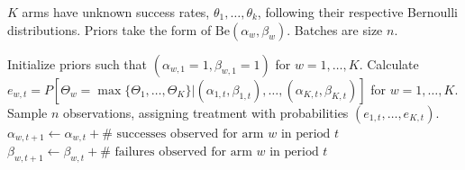 \documentclass[xcolor={table}]{beamer}
\begin{document}
\begin{frame}[label=ts]

\begin{framed}
\begin{minipage}{\textwidth}
\tiny
\vspace{-2.5 em}
\begin{algorithm}[H]
\fontsize{5}{6}\selectfont
    \caption{Batch-wise Bernoulli Thompson sampling}
    \label{algg:ts}
 $K$ arms have unknown success rates, $\theta_1, \dots, \theta_k$, following their respective Bernoulli distributions. Priors take the form of $\textrm{Be}(\alpha_w, \beta_w)$. Batches are size $n$.\\
    \begin{algorithmic}[1]

\State Initialize priors such that $(\alpha_{w,1} =1 , \beta_{w, 1}= 1)$ for $w = 1,\dots, K$.
		      \State Calculate $e_{w, t} = P\left[\Theta_w = {\max}\{\Theta_1,\dots, \Theta_K \}| (\alpha_{1,t}, \beta_{1, t}), \dots, (\alpha_{K,t} ,\beta_{K, t})  \right]$ for $w = 1,\dots, K$.
		      \State  Sample $n$ observations, assigning treatment with probabilities $(e_{1, t}, \dots, e_{K, t})$.
		     	\State $\alpha_{w, t+1} \leftarrow \alpha_{w,t} + \# \text{ successes observed for arm $w$ in period $t$}$ 
		     	\State $\beta_{w, t+1}  \leftarrow \beta_{w,t} + \# \text{ failures observed for arm $w$ in period $t$}$
		     \EndFor
	      \EndFor
	\end{algorithmic}
\end{algorithm}
 \end{minipage}
 \vspace{-0.8 em}
\end{framed}
 \vspace{-0.5 em}
 
  \hyperlink{ts-explainer}{}

\end{frame}
\end{document}
